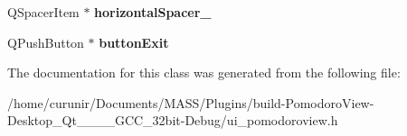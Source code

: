 \begin{DoxyCompactItemize}
\item 
Q\+Spacer\+Item $\ast$ {\bfseries horizontal\+Spacer\+\_}\hypertarget{class_ui___pomodoro_view_a7fb94c450958c0bc59778e3829a162be}{}\label{class_ui___pomodoro_view_a7fb94c450958c0bc59778e3829a162be}

\item 
Q\+Push\+Button $\ast$ {\bfseries button\+Exit}\hypertarget{class_ui___pomodoro_view_a69814800e02b83c8eff5d80ca07b13e7}{}\label{class_ui___pomodoro_view_a69814800e02b83c8eff5d80ca07b13e7}

\end{DoxyCompactItemize}


The documentation for this class was generated from the following file\+:\begin{DoxyCompactItemize}
\item 
/home/curunir/\+Documents/\+M\+A\+S\+S/\+Plugins/build-\/\+Pomodoro\+View-\/\+Desktop\+\_\+\+Qt\+\_\+\_\+\_\+\_\+\+G\+C\+C\+\_\+32bit-\/\+Debug/ui\+\_\+pomodoroview.\+h\end{DoxyCompactItemize}
